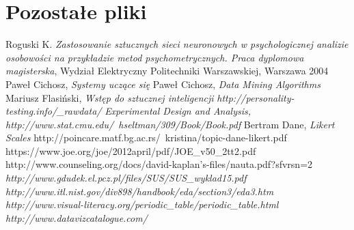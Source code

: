 \documentclass[12pt,a4paper,oneside]{report} %
\begin{document}
\section{Pozostałe pliki}

\begin{thebibliography}{9}
 Roguski K. \emph{Zastosowanie sztucznych sieci neuronowych w psychologicznej analizie osobowości na przykładzie metod psychometrycznych. Praca dyplomowa magisterska}, Wydział Elektryczny Politechniki Warszawskiej, Warszawa 2004
 Paweł Cichosz, \emph{Systemy uczące się}
 Paweł Cichosz, \emph{Data Mining Algorithms}
 Mariusz Flasiński, \emph{Wstęp do sztucznej inteligencji}
 \emph{http://personality-testing.info/_rawdata/}
 \emph{Experimental Design and Analysis, http://www.stat.cmu.edu/~hseltman/309/Book/Book.pdf}
 Bertram Dane, \emph{Likert Scales} http://poincare.matf.bg.ac.rs/~kristina/topic-dane-likert.pdf
   https://www.joe.org/joe/2012april/pdf/JOE_v50_2tt2.pdf
 http://www.counseling.org/docs/david-kaplan's-files/nauta.pdf?sfvrsn=2
 \emph{http://www.gdudek.el.pcz.pl/files/SUS/SUS_wyklad15.pdf}
 \emph{http://www.itl.nist.gov/div898/handbook/eda/section3/eda3.htm}
 \emph{http://www.visual-literacy.org/periodic_table/periodic_table.html}
 \emph{http://www.datavizcatalogue.com/}
\end{thebibliography}
\end{document}
